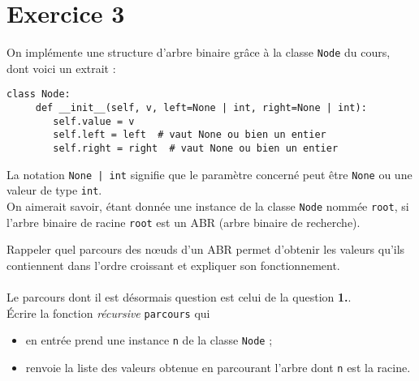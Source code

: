 \documentclass[a4paper,12pt,eval,firamath]{nsi}
\begin{document}
\maketitle

\section*{Exercice 3 \small}

\resetquestion
On implémente une structure d'arbre binaire grâce à la classe \texttt{Node} du cours, dont voici un extrait :

\begin{pyc}
      \begin{verbatim}
class Node:
     def __init__(self, v, left=None | int, right=None | int):
        self.value = v
        self.left = left  # vaut None ou bien un entier
        self.right = right  # vaut None ou bien un entier
\end{verbatim}
\end{pyc}

La notation \texttt{None | int}  signifie que le paramètre concerné peut être \texttt{None} ou une valeur de type \texttt{int}.\\


On aimerait savoir, étant donnée une instance de la classe \texttt{Node} nommée \texttt{root}, si l'arbre binaire de racine \texttt{root} est un ABR (arbre binaire de recherche). 

\question Rappeler quel parcours des n\oe uds d'un ABR permet d'obtenir les valeurs qu'ils contiennent dans l'ordre croissant et expliquer son fonctionnement.\\

\\

Le parcours dont il est désormais question est celui de la question \textbf{1.}.\\

\question Écrire la fonction \textit{récursive} \texttt{parcours} qui
\begin{itemize}
    \item en entrée prend une instance \texttt{n}   de la classe \texttt{Node} ;
    \item renvoie la liste des valeurs obtenue en parcourant l'arbre dont \texttt{n} est la racine.
\end{itemize} 
\end{document}
